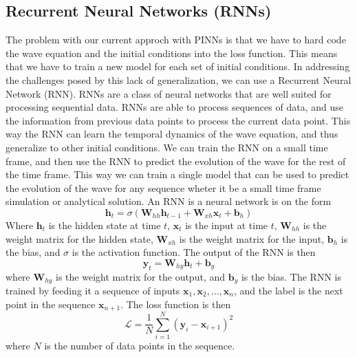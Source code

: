 \documentclass[twoside,11pt]{report}
\begin{document}
\subsection{Recurrent Neural Networks (RNNs)}
\label{sec:rnn}

    The problem with our current approch with PINNs is that we have to hard code the wave equation and the initial
    conditions into the loss function. This means that we have to train a new model for each set of initial conditions.
    In addressing the challenges posed by this lack of generalization, we can use a Recurrent Neural Network (RNN).
    RNNs are a class of neural networks that are well suited for processing sequential data. RNNs are able to process
    sequences of data, and use the information from previous data points to process the current data point. This way
    the RNN can learn the temporal dynamics of the wave equation, and thus generalize to other initial conditions.
    We can train the RNN on a small time frame, and then use the RNN to predict the evolution of the wave for the rest
    of the time frame. This way we can train a single model that can be used to predict the evolution of the wave for
    any sequence wheter it be a small time frame simulation or analytical solution.
    An RNN is a neural network is on the form 
    \begin{equation}
        \mathbf{h}_t = \sigma(\mathbf{W}_{hh}\mathbf{h}_{t-1} + \mathbf{W}_{xh}\mathbf{x}_t + \mathbf{b}_h)
    \end{equation}
    Where $\mathbf{h}_t$ is the hidden state at time $t$, $\mathbf{x}_t$ is the input at time $t$, $\mathbf{W}_{hh}$
    is the weight matrix for the hidden state, $\mathbf{W}_{xh}$ is the weight matrix for the input, $\mathbf{b}_h$
    is the bias, and $\sigma$ is the activation function. The output of the RNN is then
    \begin{equation}
        \mathbf{y}_t = \mathbf{W}_{hy}\mathbf{h}_t + \mathbf{b}_y
    \end{equation}
    where $\mathbf{W}_{hy}$ is the weight matrix for the output, and $\mathbf{b}_y$ is the bias.
    The RNN is trained by feeding it a sequence of inputs $\mathbf{x}_1, \mathbf{x}_2, \dots, \mathbf{x}_n$,
    and the label is the next point in the sequence $\mathbf{x}_{n+1}$. The loss function is then
    \begin{equation}
        \mathcal{L} = \frac{1}{N}\sum_{i=1}^{N} (\mathbf{y}_i - \mathbf{x}_{i+1})^2
    \end{equation}
    where $N$ is the number of data points in the sequence.
\end{document}

